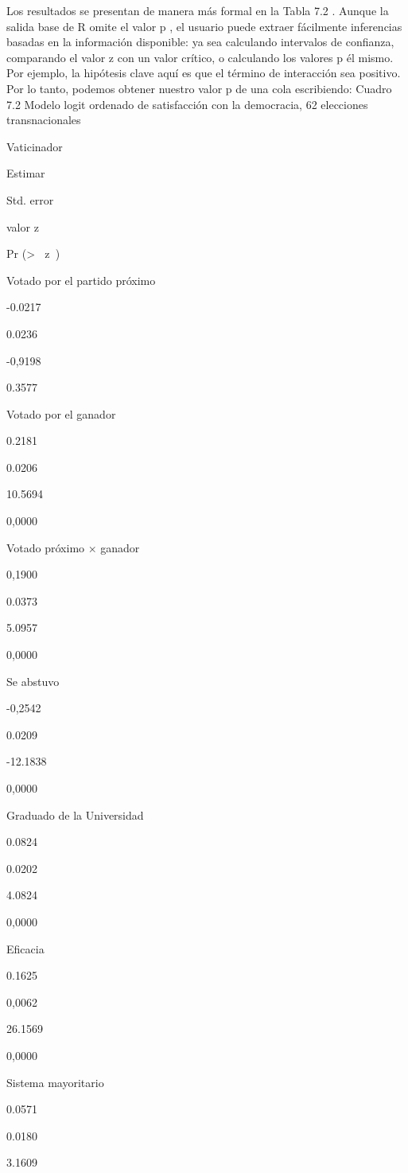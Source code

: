 \documentclass[
]{book}
\begin{document}
Los resultados se presentan de manera más formal en la Tabla 7.2 . Aunque la salida base de R omite el valor p , el usuario puede extraer fácilmente inferencias basadas en la información disponible: ya sea calculando intervalos de confianza, comparando el valor z con un valor crítico, o calculando los valores p él mismo. Por ejemplo, la hipótesis clave aquí es que el término de interacción sea positivo. Por lo tanto, podemos obtener nuestro valor p de una cola escribiendo:
Cuadro 7.2
Modelo logit ordenado de satisfacción con la democracia, 62 elecciones transnacionales

Vaticinador

Estimar

Std. error

valor z

Pr (\textgreater{} \textbar{}  z  \textbar)

Votado por el partido próximo

-0.0217

0.0236

-0,9198

0.3577

Votado por el ganador

0.2181

0.0206

10.5694

0,0000

Votado próximo × ganador

0,1900

0.0373

5.0957

0,0000

Se abstuvo

-0,2542

0.0209

-12.1838

0,0000

Graduado de la Universidad

0.0824

0.0202

4.0824

0,0000

Eficacia

0.1625

0,0062

26.1569

0,0000

Sistema mayoritario

0.0571

0.0180

3.1609
\end{document}
